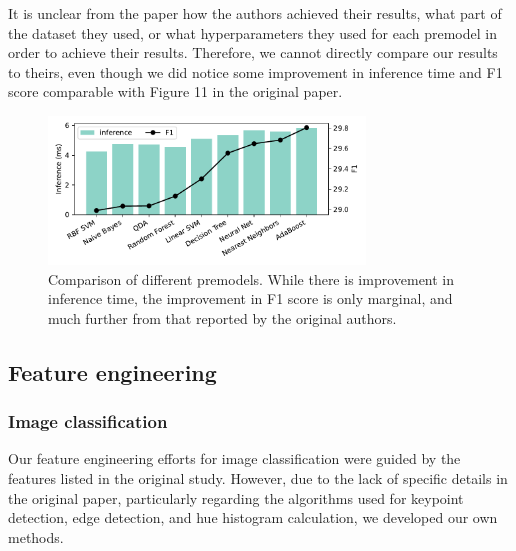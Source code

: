 It is unclear from the paper how the authors achieved their results, what part of the dataset they used, or what hyperparameters they used for each premodel in order to achieve their results. Therefore, we cannot directly compare our results to theirs, even though we did notice some improvement in inference time and F1 score comparable with Figure 11 in the original paper.

\begin{figure}[ht]
	\centering
	\includegraphics[width=0.75\textwidth]{figures/ml_inf_premodel.pdf}
	\caption{Comparison of different premodels. While there is improvement in inference time, the improvement in F1 score is only marginal, and much further from that reported by the original authors.}
	\label{fig:nlp_premodels}
\end{figure}




\subsection{Feature engineering}
\subsubsection{Image classification}

Our feature engineering efforts for image classification were guided by the features listed in the original study. However, due to the lack of specific details in the original paper, particularly regarding the algorithms used for keypoint detection, edge detection, and hue histogram calculation, we developed our own methods.

